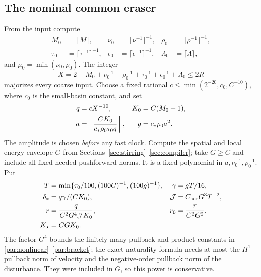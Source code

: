 \documentclass[11pt,a4paper]{amsart}
\theoremstyle{definition}
\theoremstyle{remark}
\numberwithin{equation}{section}
\begin{document}
\subsection{The nominal common eraser}
From the input compute
\begin{align*}
 M_0&=\lceil M\rceil,& \nu_0&=\lceil\nu_-^{-1}\rceil^{-1},&
 \rho_0&=\lceil\rho_-^{-1}\rceil^{-1},\\
 \tau_0&=\lceil\tau^{-1}\rceil^{-1},&
 \epsilon_0&=\lceil\epsilon^{-1}\rceil^{-1},&
 \Lambda_0&=\lceil\Lambda\rceil,
\end{align*}
and $\mu_0=\min(\nu_0,\rho_0)$. The integer
\[
 X=2+M_0+\nu_0^{-1}+\rho_0^{-1}+\tau_0^{-1}
          +\epsilon_0^{-1}+\Lambda_0\le2R
\]
majorizes every coarse input. Choose a fixed rational
$c\le\min(2^{-20},c_0,C^{-10})$, where $c_0$ is the small-basin constant,
and set
\begin{align}\label{eq:globalschedule}
 q&=cX^{-10},& K_0&=C(M_0+1),\notag\\
 a&=\left\lceil\frac{C K_0}{c_*\rho_0\tau_0q}\right\rceil,
 &g&=c_*\rho_0a^2.
\end{align}
The amplitude is chosen \emph{before} any fast clock. Compute the spatial and local energy envelope $G$ from Sections~\ref{sec:stirring}--\ref{sec:compiler}; take $G\ge C$ and include all fixed needed pushforward norms. It is a fixed polynomial in $a,\nu_0^{-1},\rho_0^{-1}$. Put
\begin{align}\label{eq:macrochoices}
 T&=\min\{\tau_0/100,(100G)^{-1},(100g)^{-1}\},&
 \gamma&=gT/16,\notag\\
 \delta_*&=q\gamma/(C K_0),&
 \mathcal J&=C_{\rm ker}G^3T^{-2},\notag\\
 r&=\frac{q}{C^2 G^4\mathcal J K_0},&
 r_0&=\frac{r}{C^2G^2},\notag\\
 K_\star&=C G K_0.
\end{align}
The factor $G^4$ bounds the finitely many pullback and product constants in
\eqref{par:nonlinear}--\eqref{par:bracket}; the exact naturality formula needs at most the $H^1$ pullback norm of velocity and the negative-order pullback norm of the disturbance. They were included in $G$, so this power is conservative.
\end{document}
